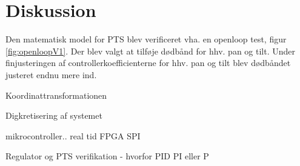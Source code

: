 \section{Diskussion}
\label{sec:diskussion}

Den matematisk model for PTS blev verificeret vha. en openloop test, figur \ref{fig:openloopV1}. Der blev valgt at tilføje dødbånd for hhv. pan og tilt. Under finjusteringen af controllerkoefficienterne for hhv. pan og tilt blev dødbåndet justeret endnu mere ind. 

Koordinattransformationen 


Digkretisering af systemet



mikrocontroller.. real tid 
FPGA
SPI




Regulator og PTS verifikation
- hvorfor PID PI eller P